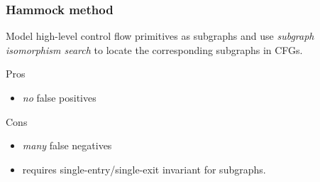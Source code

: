 \documentclass[aspectratio=1610]{beamer}
\begin{document}
\begin{frame}
	\frametitle{Hammock method}

	Model high-level control flow primitives as subgraphs and use \textit{subgraph isomorphism search} to locate the corresponding subgraphs in CFGs.

	\vspace*{2em}

	\begin{block}{Pros}
		\begin{itemize}
			\item \textit{no} false positives
		\end{itemize}
	\end{block}

	\begin{block}{Cons}
		\begin{itemize}
			\item \textit{many} false negatives
			\item requires single-entry/single-exit invariant for subgraphs.
		\end{itemize}
	\end{block}

\end{frame}
\end{document}
